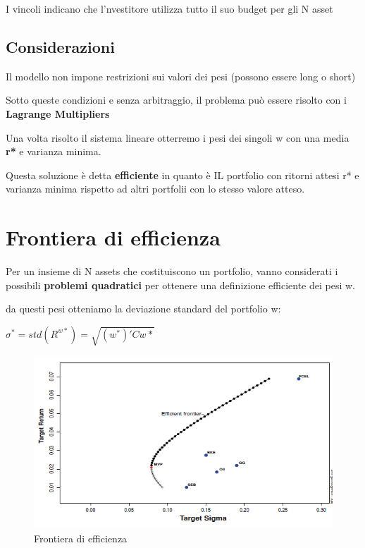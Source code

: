 \documentclass[a4paper,11pt]{report}
\begin{document}
{	I vincoli indicano che l'nvestitore utilizza tutto il suo budget per gli N asset
\subsection{Considerazioni}
	Il modello non impone restrizioni sui valori dei pesi (possono essere long o short)

	Sotto queste condizioni e senza arbitraggio, il problema può essere risolto con i \textbf{Lagrange Multipliers}

	Una volta risolto il sistema lineare otterremo i pesi dei singoli w con una media \textbf{r*} e varianza minima.

	Questa soluzione è detta \textbf{efficiente} in quanto è IL portfolio con ritorni attesi r* e varianza minima rispetto ad altri 			portfolii con lo stesso valore atteso.
\section{Frontiera di efficienza}
	Per un insieme di N assets che costituiscono un portfolio, vanno considerati i possibili \textbf{problemi quadratici} per 			ottenere
	una definizione efficiente dei pesi w. \newline

	da questi pesi otteniamo la deviazione standard del portfolio w:
\begin{center}
	$\sigma^*=std(R^{w*})=\sqrt{(w^*)'Cw*}$
\end{center}
\begin{figure}[h]
  \includegraphics[width=\linewidth]{EfficientFrontier.png}
  \caption{Frontiera di efficienza}
  \label{fig:EfficientFrontier}
\end{figure}

\newpage

}
\end{document}
